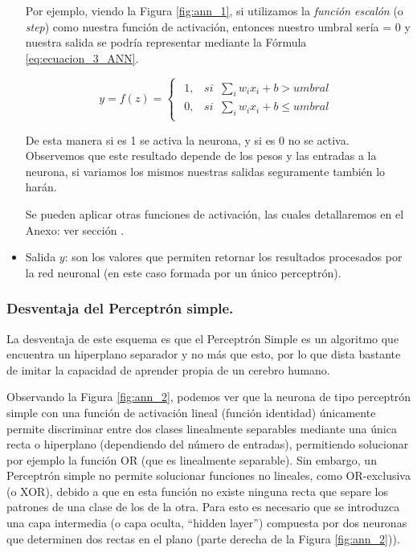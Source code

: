 \documentclass[12pt,a4paper]{article}
\begin{document}
\begin{sloppypar}
\begin{itemize}
Por ejemplo, viendo la Figura \ref{fig:ann_1}, si utilizamos la \textit{función escalón} (o \textit{step}) como nuestra función de activación, entonces nuestro umbral sería = 0 y nuestra salida se podría representar mediante la Fórmula \ref{eq:ecuacion_3_ANN}.

\begin{equation}\label{eq:ecuacion_3_ANN}
y = f(z) =  
\begin{cases}
\begin{array}{lr}
1,\;\;\;    si \;\; \sum_{i}w_{i}x_{i}+b > umbral \\
0,\;\;\;    si \;\; \sum_{i}w_{i}x_{i}+b \leq  umbral
\end{array}
\end{cases}
\end{equation}

De esta manera si es 1 se activa la neurona, y si es 0 no se activa. Observemos que este resultado depende de los pesos y las entradas a la neurona, si variamos los mismos nuestras salidas seguramente también lo harán.

Se pueden aplicar otras funciones de activación, las cuales detallaremos en el Anexo: ver sección \textit{}.

\item Salida $y$: son los valores que permiten retornar los resultados procesados por la red neuronal (en este caso formada por un único perceptrón).

\end{itemize}

\subsubsection{Desventaja del Perceptrón simple. }
La desventaja de este esquema es que el Perceptrón Simple es un algoritmo que encuentra un hiperplano separador y no más que esto, por lo que dista bastante de imitar la capacidad de aprender propia de un cerebro humano.

Observando la Figura \ref{fig:ann_2}, podemos ver que la neurona de tipo perceptrón simple con una función de activación lineal (función identidad) únicamente permite discriminar entre dos clases linealmente separables mediante una única recta o hiperplano (dependiendo del número de entradas), permitiendo solucionar por ejemplo la función OR (que es linealmente separable). Sin embargo, un Perceptrón simple no permite solucionar funciones no lineales, como OR-exclusiva (o XOR), debido a que en esta función no existe ninguna recta que separe los patrones de una clase de los de la otra. Para esto es necesario que se introduzca una capa intermedia (o capa oculta, ``hidden layer'') compuesta por dos neuronas que determinen dos rectas en el plano (parte derecha de la Figura \ref{fig:ann_2})\cite{ANN_24}).


\end{sloppypar}
\end{document}

